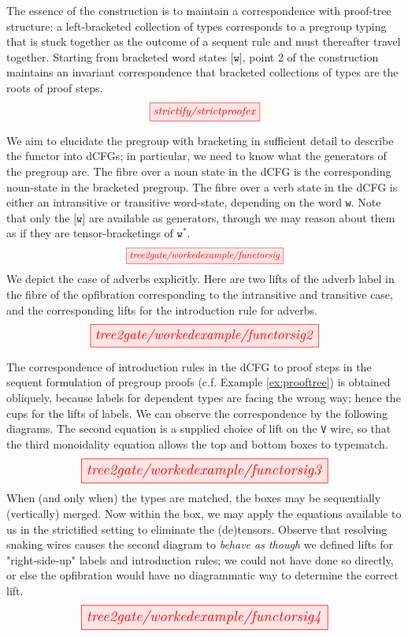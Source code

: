 \begin{example}\label{ex:prooftree}
The essence of the construction is to maintain a correspondence with proof-tree structure: a left-bracketed collection of types corresponds to a pregroup typing that is stuck together as the outcome of a sequent rule and must thereafter travel together. Starting from bracketed word states $\texttt{[w]}$, point 2 of the construction maintains an invariant correspondence that bracketed collections of types are the roots of proof steps.
\[\tikzfig{strictify/strictproofex}\]
\end{example}

\begin{myboxR}
\begin{construction}\label{cons:pg2cfg} We aim to elucidate the pregroup with bracketing in sufficient detail to describe the functor into dCFGs; in particular, we need to know what the generators of the pregroup are. The fibre over a noun state in the dCFG is the corresponding noun-state in the bracketed pregroup. The fibre over a verb state in the dCFG is either an intransitive or transitive word-state, depending on the word \texttt{w}. Note that only the $\texttt{[w]}$ are available as generators, through we may reason about them as if they are tensor-bracketings of $\texttt{w}^*$.
\[\resizebox{0.45\textwidth}{!}{\tikzfig{tree2gate/workedexample/functorsig}}\]
We depict the case of adverbs explicitly. Here are two lifts of the adverb label in the fibre of the opfibration corresponding to the intransitive and transitive case, and the corresponding lifts for the introduction rule for adverbs.
\[\resizebox{0.65\textwidth}{!}{\tikzfig{tree2gate/workedexample/functorsig2}}\]
\end{construction}
\end{myboxR}

\begin{myboxR}
The correspondence of introduction rules in the dCFG to proof steps in the sequent formulation of pregroup proofs (c.f. Example \ref{ex:prooftree}) is obtained obliquely, because labels for dependent types are facing the wrong way; hence the cups for the lifts of labels. We can observe the correspondence by the following diagrams. The second equation is a supplied choice of lift on the \texttt{V} wire, so that the third monoidality equation allows the top and bottom boxes to typematch.
\[\resizebox{0.7\textwidth}{!}{\tikzfig{tree2gate/workedexample/functorsig3}}\]
When (and only when) the types are matched, the boxes may be sequentially (vertically) merged. Now within the box, we may apply the equations available to us in the strictified setting to eliminate the (de)tensors. Observe that resolving snaking wires causes the second diagram to \emph{behave as though} we defined lifts for "right-side-up" labels and introduction rules; we could not have done so directly, or else the opfibration would have no diagrammatic way to determine the correct lift.
\[\resizebox{0.7\textwidth}{!}{\tikzfig{tree2gate/workedexample/functorsig4}}\]
\end{myboxR}

